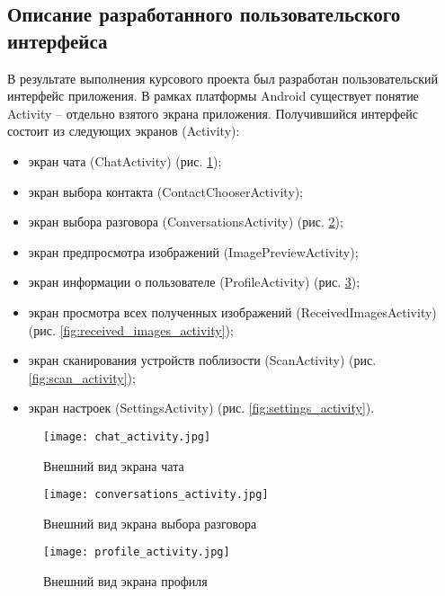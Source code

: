 \subsection{Описание разработанного пользовательского интерфейса}
\label{sub:gui_design:description}

В результате выполнения курсового проекта был разработан пользовательский интерфейс приложения.
В рамках платформы Android существует понятие Activity -- отдельно взятого экрана приложения.
Получившийся интерфейс состоит из следующих экранов (Activity):
\begin{itemize}
	\item экран чата (ChatActivity) (рис. \ref{fig:chat_activity});
	\item экран выбора контакта (ContactChooserActivity);
	\item экран выбора разговора (ConversationsActivity) (рис. \ref{fig:conversations_activity});
	\item экран предпросмотра изображений (ImagePreviewActivity);
	\item экран информации о пользователе (ProfileActivity) (рис. \ref{fig:profile_activity});
	\item экран просмотра всех полученных изображений (ReceivedImagesActivity) (рис. \ref{fig:received_images_activity});
	\item экран сканирования устройств поблизости (ScanActivity) (рис. \ref{fig:scan_activity});
	\item экран настроек (SettingsActivity) (рис. \ref{fig:settings_activity}).
\end{itemize}

\begin{figure}[ht]
    \centering                                                           
    \texttt{[image: chat\_activity.jpg]}
	\caption{Внешний вид экрана чата}
	\label{fig:chat_activity}
\end{figure}

\begin{figure}[ht]
    \centering                                                           
    \texttt{[image: conversations\_activity.jpg]}
	\caption{Внешний вид экрана выбора разговора}
	\label{fig:conversations_activity}
\end{figure}

\begin{figure}[ht]
    \centering                                                           
    \texttt{[image: profile\_activity.jpg]}
	\caption{Внешний вид экрана профиля}
	\label{fig:profile_activity}
\end{figure}

